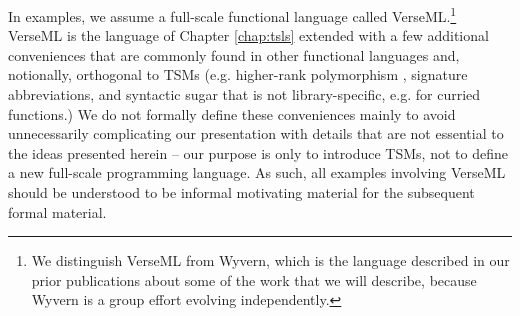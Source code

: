 In examples, we assume a full-scale functional language called VerseML.\footnote{We distinguish VerseML from Wyvern, which is the language described in our prior publications about some of the work that we will describe, because Wyvern is a group effort evolving independently.} VerseML is the language of Chapter \ref{chap:tsls}  extended with a few additional conveniences that are commonly found in other functional languages and, notionally, orthogonal to TSMs (e.g. higher-rank polymorphism \cite{conf/icfp/DunfieldK13}, signature abbreviations, and syntactic sugar that is not library-specific, e.g. for curried functions.) %
We do not formally define these conveniences mainly to avoid unnecessarily complicating our presentation with details that are not essential to the ideas presented herein -- our purpose is only to introduce TSMs, not to define a new full-scale programming language. As such, all examples involving VerseML should be understood to be informal motivating material for the subsequent formal material. %



